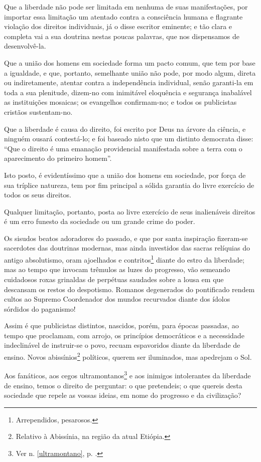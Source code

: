 Que a liberdade não pode ser limitada em nenhuma de suas manifestações,
por importar essa limitação um atentado contra a consciência humana e
flagrante violação dos direitos individuais, já o disse escritor
eminente; e tão clara e completa vai a sua doutrina nestas poucas
palavras, que nos dispensamos de desenvolvê-la.

Que a união dos homens em sociedade forma um pacto comum, que tem por
base a igualdade, e que, portanto, semelhante união não pode, por modo
algum, direta ou indiretamente, atentar contra a independência
individual, senão garanti-la em toda a sua plenitude, dizem-no com
inimitável eloquência e segurança inabalável as instituições mosaicas;
os evangelhos confirmam-no; e todos os publicistas cristãos
sustentam-no.

Que a liberdade é causa do direito, foi escrito por Deus na árvore da
ciência, e ninguém ousará contestá-lo; e foi baseado nisto que um
distinto democrata disse: ``Que o direito é uma emanação providencial
manifestada sobre a terra com o aparecimento do primeiro homem''.

Isto posto, é evidentíssimo que a união dos homens em sociedade, por
força de sua tríplice natureza, tem por fim principal a sólida garantia
do livre exercício de todos os seus direitos.

Qualquer limitação, portanto, posta ao livre exercício de seus
inalienáveis direitos é um erro funesto da sociedade ou um grande crime
do poder.

Os sisudos beatos adoradores do passado, e que por santa inspiração
fizeram-se sacerdotes das doutrinas modernas, mas ainda investidos das
sacras relíquias do antigo absolutismo, oram ajoelhados e
contritos\footnote{Arrependidos, pesarosos.} diante do estro da
liberdade; mas ao tempo que invocam trêmulos as luzes do progresso, vão
semeando cuidadosos roxas grinaldas de perpétuas saudades sobre a lousa
em que descansam os restos do despotismo. Romanos degenerados do
pontificado rendem cultos ao Supremo Coordenador dos mundos recurvados
diante dos ídolos sórdidos do paganismo!

Assim é que publicistas distintos, nascidos, porém, para épocas
passadas, ao tempo que proclamam, com arrojo, os princípios democráticos
e a necessidade indeclinável de instruir-se o povo, recuam espavoridos
diante da liberdade de ensino. Novos abissínios\footnote{Relativo à
  Abissínia, na região da atual Etiópia.} políticos, querem ser
iluminados, mas apedrejam o Sol.

Aos fanáticos, aos cegos ultramontanos\footnote{Ver n. \ref{ultramontano}, 
p. \pageref{ultramontano}.} e aos inimigos intolerantes da liberdade de ensino,
temos o direito de perguntar: o que pretendeis; o que quereis desta
sociedade que repele as vossas ideias, em nome do progresso e da
civilização?

